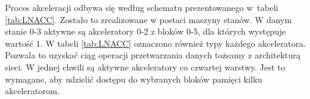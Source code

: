 
Proces akceleracji odbywa się według schematu prezentowanego w~tabeli \ref{tab:LNACC}.
Zostało to zrealizowane w postaci maszyny stanów.
W danym stanie 0-3 aktywne są akceleratory 0-2 z bloków 0-5, dla których występuje wartość 1.
W tabeli \ref{tab:LNACC} oznaczono również typy każdego akceleratora.
Pozwala to uzyskać ciąg operacji przetwarzania danych tożsamy z architekturą sieci. 
W jednej chwili są aktywne akceleratory co czwartej warstwy.
Jest to wymagane, aby udzielić dostępu do wybranych bloków pamięci kilku akceleratorom.

